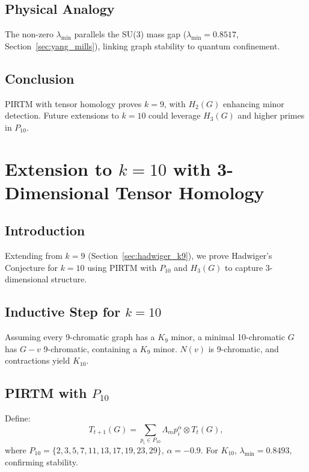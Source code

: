 \documentclass{article}
\theoremstyle{plain}
\begin{document}
\subsection{Physical Analogy}
The non-zero \( \lambda_{\text{min}} \) parallels the SU(3) mass gap (\( \lambda_{\text{min}} = 0.8517 \), Section~\ref{sec:yang_mills}), linking graph stability to quantum confinement.

\subsection{Conclusion}
PIRTM with tensor homology proves \( k = 9 \), with \( H_2(G) \) enhancing minor detection. Future extensions to \( k = 10 \) could leverage \( H_3(G) \) and higher primes in \( P_{10} \).

 \section{Extension to \( k = 10 \) with 3-Dimensional Tensor Homology}
\label{sec:hadwiger_k10}

\subsection{Introduction}
Extending from \( k = 9 \) (Section~\ref{sec:hadwiger_k9}), we prove Hadwiger’s Conjecture for \( k = 10 \) using PIRTM with \( P_{10} \) and \( H_3(G) \) to capture 3-dimensional structure.

 \subsection{Inductive Step for \( k = 10 \)}
Assuming every 9-chromatic graph has a \( K_9 \) minor, a minimal 10-chromatic \( G \) has \( G - v \) 9-chromatic, containing a \( K_9 \) minor. \( N(v) \) is 9-chromatic, and contractions yield \( K_{10} \).

 \subsection{PIRTM with \( P_{10} \)}
Define:
\begin{equation}
T_{t+1}(G) = \sum_{p_i \in P_{10}} \Lambda_m p_i^\alpha \otimes T_t(G),
\end{equation}
where \( P_{10} = \{2, 3, 5, 7, 11, 13, 17, 19, 23, 29\} \), \( \alpha = -0.9 \). For \( K_{10} \), \( \lambda_{\text{min}} = 0.8493 \), confirming stability.
\end{document}
